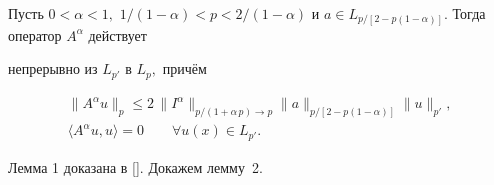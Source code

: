 \begin{lemma}[2]Пусть $0<\alpha<1,$ $1/(1-\alpha)<p<2/(1-\alpha)$ и $a\in

L_{p/[2-p(1-\alpha)]}.$ Тогда оператор $A^{\alpha}$ действует

непрерывно из $L_{p'}$ в $L_p,$ причём

\begin{gather}

\label{askh2} \|A^{\alpha}u\|_p\leq

2\,\|I^\alpha\|_{p/(1+\alpha\,p)\to

p}\|a\|_{p/[2-p(1-\alpha)]}\|u\|_{p'},\\

\label{posit2} \langle A^\alpha u, u\rangle = 0 \qquad \forall

u(x)\in L_{p'}.

\end{gather}

\end{lemma}



Лемма 1 доказана в []. Докажем  лемму~2.



